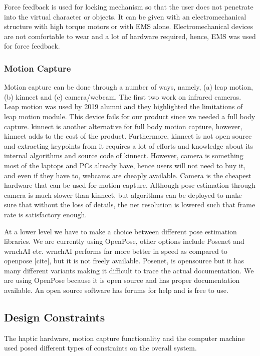 Force feedback is used for locking mechanism so that the user does not penetrate into the virtual character or objects. It can be given with an electromechanical structure with high torque motors or with EMS alone. Electromechanical devices are not comfortable to wear and a lot of hardware required, hence, EMS was used for force feedback.

\subsubsection{Motion Capture}

Motion capture can be done through a number of ways, namely, (a) leap motion, (b) kinnect and (c) camera/webcam. The first two work on infrared cameras. Leap motion was used by 2019 alumni and they highlighted the limitations of leap motion module. This device fails for our product since we needed a full body capture. kinnect is another alternative for full body motion capture, however, kinnect adds to the cost of the product. Furthermore, kinnect is not open source and extracting keypoints from it requires a lot of efforts and knowledge about its internal algorithms and source code of kinnect. However, camera is something most of the laptops and PCs already have, hence users will not need to buy it, and even if they have to, webcams are cheaply available. Camera is the cheapest hardware that can be used for motion capture. Although pose estimation through camera is much slower than kinnect, but algorithms can be deployed to make sure that without the loss of details, the net resolution is lowered such that frame rate is satisfactory enough. 

At a lower level we have to make a choice between different pose estimation libraries. We are currently using OpenPose, other options include Posenet and wrnchAI etc. wrnchAI performs far more better in speed as compared to openpose [cite], but it is not freely available. Posenet, is opensource but it has many different variants making it difficult to trace the actual documentation. We are using OpenPose because it is open source and has proper documentation available. An open source software has forums for help and is free to use. 


\subsection{Design Constraints}
\label{sub:designConstraints}
The haptic hardware, motion capture functionality and the computer machine used posed different types of constraints on the overall system. 

